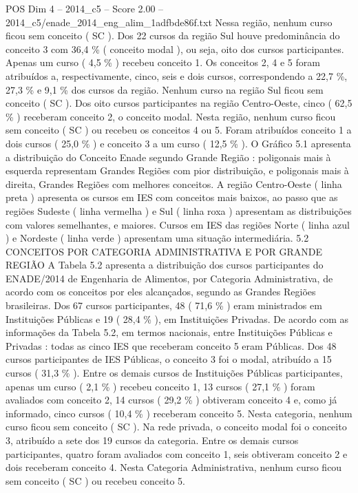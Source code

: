 \begin{textsample}{POS Dim 4 – 2014\_c5 – Score 2.00 – 2014\_c5/enade\_2014\_eng\_alim\_1adfbde86f.txt}
Nessa região, nenhum curso ficou sem conceito ( SC ).
Dos 22 cursos da região Sul houve predominância do conceito 3 com 36,4 \% ( conceito modal ), ou seja, oito dos cursos participantes.
Apenas um curso ( 4,5 \% ) recebeu conceito 1.
Os conceitos 2, 4 e 5 foram atribuídos a, respectivamente, cinco, seis e dois cursos, correspondendo a 22,7 \%, 27,3 \% e 9,1 \% dos cursos da região.
Nenhum curso na região Sul ficou sem conceito ( SC ).
Dos oito cursos participantes na região Centro-Oeste, cinco ( 62,5 \% ) receberam conceito 2, o conceito modal.
Nesta região, nenhum curso ficou sem conceito ( SC ) ou recebeu os conceitos 4 ou 5.
Foram atribuídos conceito 1 a dois cursos ( 25,0 \% ) e conceito 3 a um curso ( 12,5 \% ).
O Gráfico 5.1 apresenta a distribuição do Conceito Enade segundo Grande Região : poligonais mais à esquerda representam Grandes Regiões com pior distribuição, e poligonais mais à direita, Grandes Regiões com melhores conceitos.
A região Centro-Oeste ( linha preta ) apresenta os cursos em IES com conceitos mais baixos, ao passo que as regiões Sudeste ( linha vermelha ) e Sul ( linha roxa ) apresentam as distribuições com valores semelhantes, e maiores.
Cursos em IES das regiões Norte ( linha azul ) e Nordeste ( linha verde ) apresentam uma situação intermediária. 5.2 CONCEITOS POR CATEGORIA ADMINISTRATIVA E POR GRANDE REGIÃO A Tabela 5.2 apresenta a distribuição dos cursos participantes do ENADE/2014 de Engenharia de Alimentos, por Categoria Administrativa, de acordo com os conceitos por eles alcançados, segundo as Grandes Regiões brasileiras.
Dos 67 cursos participantes, 48 ( 71,6 \% ) eram ministrados em Instituições Públicas e 19 ( 28,4 \% ), em Instituições Privadas.
De acordo com as informações da Tabela 5.2, em termos nacionais, entre Instituições Públicas e Privadas : todas as cinco IES que receberam conceito 5 eram Públicas.
Dos 48 cursos participantes de IES Públicas, o conceito 3 foi o modal, atribuído a 15 cursos ( 31,3 \% ).
Entre os demais cursos de Instituições Públicas participantes, apenas um curso ( 2,1 \% ) recebeu conceito 1, 13 cursos ( 27,1 \% ) foram avaliados com conceito 2, 14 cursos ( 29,2 \% ) obtiveram conceito 4 e, como já informado, cinco cursos ( 10,4 \% ) receberam conceito 5.
Nesta categoria, nenhum curso ficou sem conceito ( SC ).
Na rede privada, o conceito modal foi o conceito 3, atribuído a sete dos 19 cursos da categoria.
Entre os demais cursos participantes, quatro foram avaliados com conceito 1, seis obtiveram conceito 2 e dois receberam conceito 4.
Nesta Categoria Administrativa, nenhum curso ficou sem conceito ( SC ) ou recebeu conceito 5.

\end{textsample}
